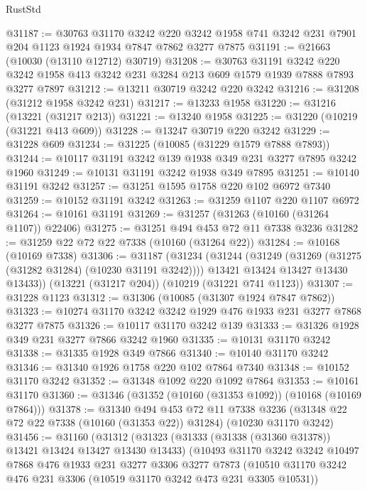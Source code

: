 \begin{lexlean}{RustStd}
\begin{coremodule}
@31187 := @30763
    @31170
    @3242
    @220
    @3242
    @1958
    @741
    @3242
    @231
    @7901
    @204
    @1123
    @1924
    @1934
    @7847
    @7862
    @3277
    @7875
@31191 := @21663 (@10030 (@13110 @12712) @30719)
@31208 := @30763
    @31191
    @3242
    @220
    @3242
    @1958
    @413
    @3242
    @231
    @3284
    @213
    @609
    @1579
    @1939
    @7888
    @7893
    @3277
    @7897
@31212 := @13211 @30719 @3242 @220 @3242
@31216 := @31208 (@31212 @1958 @3242 @231)
@31217 := @13233 @1958
@31220 := @31216 (@13221 (@31217 @213))
@31221 := @13240 @1958
@31225 := @31220 (@10219 (@31221 @413 @609))
@31228 := @13247 @30719 @220 @3242
@31229 := @31228 @609
@31234 := @31225 (@10085 (@31229 @1579 @7888 @7893))
@31244 := @10117 @31191 @3242 @139 @1938 @349 @231 @3277 @7895 @3242 @1960
@31249 := @10131 @31191 @3242 @1938 @349 @7895
@31251 := @10140 @31191 @3242
@31257 := @31251 @1595 @1758 @220 @102 @6972 @7340
@31259 := @10152 @31191 @3242
@31263 := @31259 @1107 @220 @1107 @6972
@31264 := @10161 @31191
@31269 := @31257 (@31263 (@10160 (@31264 @1107)) @22406)
@31275 := @31251 @494 @453 @72 @11 @7338 @3236
@31282 := @31259 @22 @72 @22 @7338 (@10160 (@31264 @22))
@31284 := @10168 (@10169 @7338)
@31306 := @31187
    (@31234
      (@31244
        (@31249 (@31269 (@31275 (@31282 @31284) (@10230 @31191 @3242))))
        @13421
        @13424
        @13427
        @13430
        @13433))
    (@13221 (@31217 @204))
    (@10219 (@31221 @741 @1123))
@31307 := @31228 @1123
@31312 := @31306 (@10085 (@31307 @1924 @7847 @7862))
@31323 := @10274 @31170 @3242 @3242 @1929 @476 @1933 @231 @3277 @7868 @3277 @7875
@31326 := @10117 @31170 @3242 @139
@31333 := @31326 @1928 @349 @231 @3277 @7866 @3242 @1960
@31335 := @10131 @31170 @3242
@31338 := @31335 @1928 @349 @7866
@31340 := @10140 @31170 @3242
@31346 := @31340 @1926 @1758 @220 @102 @7864 @7340
@31348 := @10152 @31170 @3242
@31352 := @31348 @1092 @220 @1092 @7864
@31353 := @10161 @31170
@31360 := @31346 (@31352 (@10160 (@31353 @1092)) (@10168 (@10169 @7864)))
@31378 := @31340
    @494
    @453
    @72
    @11
    @7338
    @3236
    (@31348 @22 @72 @22 @7338 (@10160 (@31353 @22)) @31284)
    (@10230 @31170 @3242)
@31456 := @31160
    (@31312
      (@31323
        (@31333 (@31338 (@31360 @31378)) @13421 @13424 @13427 @13430 @13433)
        (@10493
          @31170
          @3242
          @3242
          @10497
          @7868
          @476
          @1933
          @231
          @3277
          @3306
          @3277
          @7873
          (@10510 @31170 @3242 @476 @231 @3306 (@10519 @31170 @3242 @473 @231 @3305 @10531))

\end{coremodule}
\end{lexlean}
